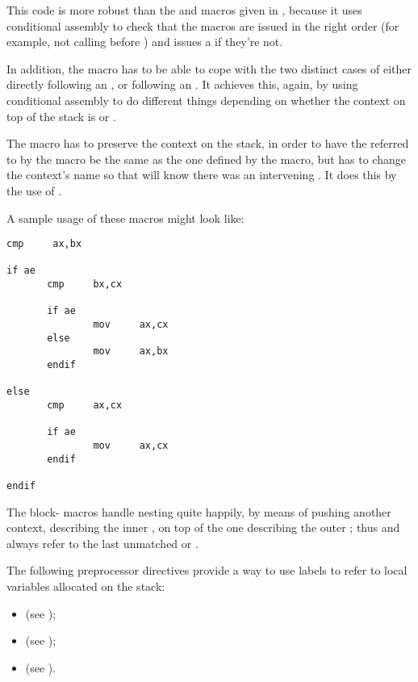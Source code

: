 This code is more robust than the  and  macros
given in , because it uses conditional assembly to check
that the macros are issued in the right order (for example, not calling 
before ) and issues a  if they're not.

In addition, the  macro has to be able to cope with the two
distinct cases of either directly following an , or following
an . It achieves this, again, by using conditional assembly
to do different things depending on whether the context on top of
the stack is  or .

The  macro has to preserve the context on the stack, in
order to have the  referred to by the  macro be the
same as the one defined by the  macro, but has to change
the context's name so that  will know there was an
intervening . It does this by the use of .

A sample usage of these macros might look like:

\begin{lstlisting}
cmp     ax,bx

if ae
       cmp     bx,cx

       if ae
               mov     ax,cx
       else
               mov     ax,bx
       endif

else
       cmp     ax,cx

       if ae
               mov     ax,cx
       endif

endif
\end{lstlisting}

The block- macros handle nesting quite happily, by means of
pushing another context, describing the inner , on top of the
one describing the outer ; thus  and 
always refer to the last unmatched  or .


The following preprocessor directives provide a way to use
labels to refer to local variables allocated on the stack:

\begin{itemize}
    \item{  (see );}
    \item{  (see );}
    \item{  (see ).}
\end{itemize}


